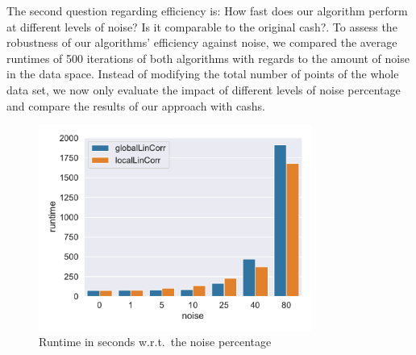 The second question regarding efficiency is: How fast does our algorithm perform at different levels of noise? Is it comparable to the original \gls{cash}?. To assess the robustness of our algorithms' efficiency against noise, we compared the average runtimes of 500 iterations of both algorithms with regards to the amount of noise in the data space. Instead of modifying the total number of points of the whole data set, we now only evaluate the impact of different levels of noise percentage and compare the results of our approach with \gls{cash}s.


\begin{figure}[h]
    \centering
        \includegraphics[width=0.8\textwidth]{evaluation/per_noise/Avg_Runtime_3D_O10000_pnoise_bar.pdf}
    \caption{Runtime in seconds w.r.t.\ the noise percentage}
    \label{fig:eval_per_noise}
\end{figure}

